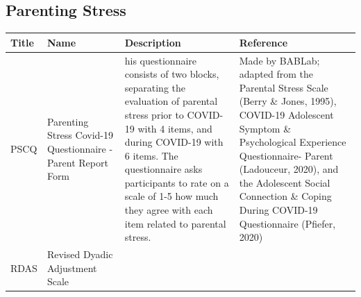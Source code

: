 \documentclass[]{book}
\begin{document}
\hypertarget{parenting-stress}{%
\subsection{Parenting Stress}\label{parenting-stress}}

\begin{longtable}[]{@{}llll@{}}
\toprule
\begin{minipage}[b]{0.12\columnwidth}\raggedright
Title\strut
\end{minipage} & \begin{minipage}[b]{0.19\columnwidth}\raggedright
Name\strut
\end{minipage} & \begin{minipage}[b]{0.32\columnwidth}\raggedright
Description\strut
\end{minipage} & \begin{minipage}[b]{0.25\columnwidth}\raggedright
Reference\strut
\end{minipage}\tabularnewline
\midrule
\endhead
\begin{minipage}[t]{0.12\columnwidth}\raggedright
PSCQ\strut
\end{minipage} & \begin{minipage}[t]{0.19\columnwidth}\raggedright
Parenting Stress Covid-19 Questionnaire - Parent Report Form\strut
\end{minipage} & \begin{minipage}[t]{0.32\columnwidth}\raggedright
his questionnaire consists of two blocks, separating the evaluation of parental stress prior to COVID-19 with 4 items, and during COVID-19 with 6 items. The questionnaire asks participants to rate on a scale of 1-5 how much they agree with each item related to parental stress.\strut
\end{minipage} & \begin{minipage}[t]{0.25\columnwidth}\raggedright
Made by BABLab; adapted from the Parental Stress Scale (Berry \& Jones, 1995), COVID-19 Adolescent Symptom \& Psychological Experience Questionnaire- Parent (Ladouceur, 2020), and the Adolescent Social Connection \& Coping During COVID-19 Questionnaire (Pfiefer, 2020)\strut
\end{minipage}\tabularnewline
\begin{minipage}[t]{0.12\columnwidth}\raggedright
RDAS\strut
\end{minipage} & \begin{minipage}[t]{0.19\columnwidth}\raggedright
Revised Dyadic Adjustment Scale\strut
\end{minipage} & \begin{minipage}[t]{0.32\columnwidth}\raggedright

\end{minipage}
\end{longtable}
\end{document}
